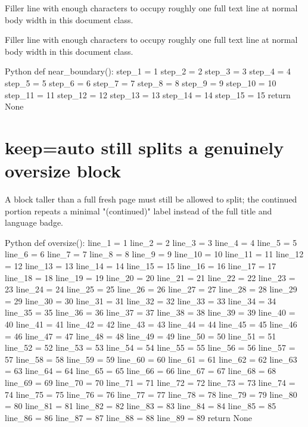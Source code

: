 \documentclass{reportkit}
\begin{document}
Filler line with enough characters to occupy roughly one full text line at normal body width in this document class.

Filler line with enough characters to occupy roughly one full text line at normal body width in this document class.


\begin{codeblock}{Python}
def near_boundary():
    step_1 = 1
    step_2 = 2
    step_3 = 3
    step_4 = 4
    step_5 = 5
    step_6 = 6
    step_7 = 7
    step_8 = 8
    step_9 = 9
    step_10 = 10
    step_11 = 11
    step_12 = 12
    step_13 = 13
    step_14 = 14
    step_15 = 15
    return None
\end{codeblock}

\section{keep=auto still splits a genuinely oversize block}
A block taller than a full fresh page must still be allowed to split; the
continued portion repeats a minimal "(continued)" label instead of the
full title and language badge.

\begin{codeblock}[keep=auto]{Python}
def oversize():
    line_1 = 1
    line_2 = 2
    line_3 = 3
    line_4 = 4
    line_5 = 5
    line_6 = 6
    line_7 = 7
    line_8 = 8
    line_9 = 9
    line_10 = 10
    line_11 = 11
    line_12 = 12
    line_13 = 13
    line_14 = 14
    line_15 = 15
    line_16 = 16
    line_17 = 17
    line_18 = 18
    line_19 = 19
    line_20 = 20
    line_21 = 21
    line_22 = 22
    line_23 = 23
    line_24 = 24
    line_25 = 25
    line_26 = 26
    line_27 = 27
    line_28 = 28
    line_29 = 29
    line_30 = 30
    line_31 = 31
    line_32 = 32
    line_33 = 33
    line_34 = 34
    line_35 = 35
    line_36 = 36
    line_37 = 37
    line_38 = 38
    line_39 = 39
    line_40 = 40
    line_41 = 41
    line_42 = 42
    line_43 = 43
    line_44 = 44
    line_45 = 45
    line_46 = 46
    line_47 = 47
    line_48 = 48
    line_49 = 49
    line_50 = 50
    line_51 = 51
    line_52 = 52
    line_53 = 53
    line_54 = 54
    line_55 = 55
    line_56 = 56
    line_57 = 57
    line_58 = 58
    line_59 = 59
    line_60 = 60
    line_61 = 61
    line_62 = 62
    line_63 = 63
    line_64 = 64
    line_65 = 65
    line_66 = 66
    line_67 = 67
    line_68 = 68
    line_69 = 69
    line_70 = 70
    line_71 = 71
    line_72 = 72
    line_73 = 73
    line_74 = 74
    line_75 = 75
    line_76 = 76
    line_77 = 77
    line_78 = 78
    line_79 = 79
    line_80 = 80
    line_81 = 81
    line_82 = 82
    line_83 = 83
    line_84 = 84
    line_85 = 85
    line_86 = 86
    line_87 = 87
    line_88 = 88
    line_89 = 89
    return None
\end{codeblock}
\end{document}
